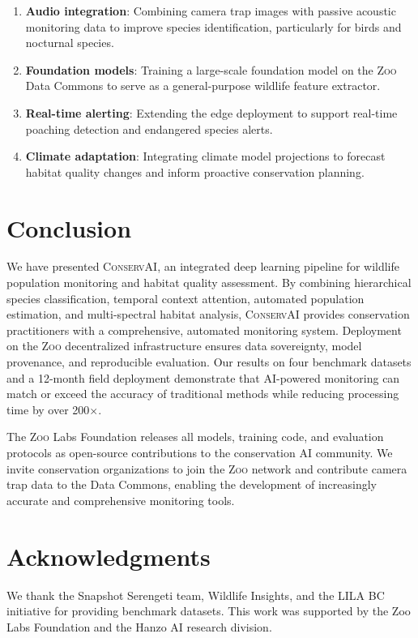\documentclass[11pt,letterpaper]{article}
\newcommand{\Zoo}{\textsc{Zoo}}
\newcommand{\ConservAI}{\textsc{ConservAI}}
\begin{document}
\begin{enumerate}[leftmargin=*]
    \item \textbf{Audio integration}: Combining camera trap images with passive acoustic monitoring data to improve species identification, particularly for birds and nocturnal species.
    \item \textbf{Foundation models}: Training a large-scale foundation model on the \Zoo{} Data Commons to serve as a general-purpose wildlife feature extractor.
    \item \textbf{Real-time alerting}: Extending the edge deployment to support real-time poaching detection and endangered species alerts.
    \item \textbf{Climate adaptation}: Integrating climate model projections to forecast habitat quality changes and inform proactive conservation planning.
\end{enumerate}

\section{Conclusion}

We have presented \ConservAI{}, an integrated deep learning pipeline for wildlife population monitoring and habitat quality assessment. By combining hierarchical species classification, temporal context attention, automated population estimation, and multi-spectral habitat analysis, \ConservAI{} provides conservation practitioners with a comprehensive, automated monitoring system. Deployment on the \Zoo{} decentralized infrastructure ensures data sovereignty, model provenance, and reproducible evaluation. Our results on four benchmark datasets and a 12-month field deployment demonstrate that AI-powered monitoring can match or exceed the accuracy of traditional methods while reducing processing time by over 200$\times$.

The \Zoo{} Labs Foundation releases all models, training code, and evaluation protocols as open-source contributions to the conservation AI community. We invite conservation organizations to join the \Zoo{} network and contribute camera trap data to the Data Commons, enabling the development of increasingly accurate and comprehensive monitoring tools.

\section*{Acknowledgments}

We thank the Snapshot Serengeti team, Wildlife Insights, and the LILA BC initiative for providing benchmark datasets. This work was supported by the Zoo Labs Foundation and the Hanzo AI research division.
\end{document}
